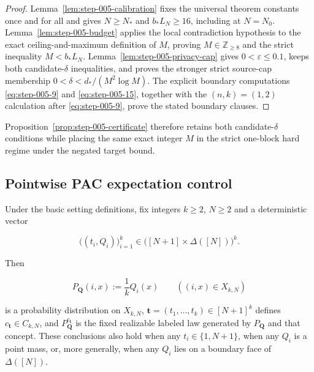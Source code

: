 \begin{proof}
Lemma~\ref{lem:step-005-calibration} fixes the universal theorem constants
once and for all and gives \(N\ge N_*\) and \(b_*L_N\ge16\), including at
\(N=N_0\). Lemma~\ref{lem:step-005-budget} applies the local contradiction
hypothesis to the exact ceiling-and-maximum definition of \(M\), proving
\(M\in\mathbb Z_{\ge8}\) and the strict inequality \(M<b_*L_N\).
Lemma~\ref{lem:step-005-privacy-cap} gives \(0<\varepsilon\le0.1\), keeps
both candidate-$\delta$ inequalities, and proves the stronger strict
source-cap membership \(0<\delta<d_*/(M^2\log M)\).
The explicit boundary computations \eqref{eq:step-005-9} and \eqref{eq:step-005-15}, together with the
\((n,k)=(1,2)\) calculation after \eqref{eq:step-005-9}, prove the stated boundary clauses.
\end{proof}
Proposition~\ref{prop:step-005-certificate} therefore retains both
candidate-$\delta$ conditions while placing the same exact integer $M$ in
the strict one-block hard regime under the negated target bound.

\subsection{Pointwise PAC expectation control}\label{app:step-006}
\begin{lemma}\label{lem:step-006-fixed-product-realizable}
Under the basic setting definitions, fix integers \(k\ge2\), \(N\ge2\)
and a deterministic vector

\[
\bigl((t_i,Q_i)\bigr)_{i=1}^k
\in\bigl([N+1]\times\Delta([N])\bigr)^k.
\]

Then

\[
P_{\boldsymbol Q}(i,x):=\frac1kQ_i(x)
\qquad((i,x)\in X_{k,N})
\]

is a probability distribution on \(X_{k,N}\),
\(\boldsymbol t=(t_1,\ldots,t_k)\in[N+1]^k\) defines
\(c_{\boldsymbol t}\in C_{k,N}\), and
\(P_{\boldsymbol Q}^{c_{\boldsymbol t}}\) is the fixed realizable
labeled law generated by \(P_{\boldsymbol Q}\) and that concept. These
conclusions also hold when any \(t_i\in\{1,N+1\}\), when any \(Q_i\) is
a point mass, or, more generally, when any \(Q_i\) lies on a boundary face
of \(\Delta([N])\).
\end{lemma}


